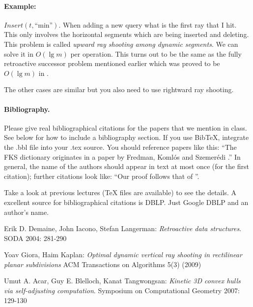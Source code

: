 \documentclass[11pt]{article}
\begin{document}
\paragraph{Example:} $Insert(t, \text{``min''})$.  When adding a new query what is the first ray that I hit.  This only involves the horizontal segments which are being inserted and deleting.  This problem is called \emph{upward ray shooting among dynamic segments}.  We can solve it in $O(\lg m)$ per operation.  This turns out to be the same as the fully retroactive successor problem mentioned earlier which was proved to be $O(\lg m)$ in \cite{gk}.

The other cases are similar but you also need to use rightward ray shooting.

\paragraph{Bibliography.}
Please give real bibliographical citations for the papers that we
mention in class. See below for how to include a bibliography section.
If you use BibTeX, integrate the .bbl file into your .tex
source. You should reference papers like this: ``The FKS
dictionary originates in a paper by Fredman, Koml\'{o}s and
Szemer\'{e}di \cite{fks}.'' In general, the name of the authors should
appear in text at most once (for the first citation); further
citations look like: ``Our proof follows that of \cite{fks}''.

Take a look at previous lectures (TeX files are available) to see the
details. A excellent source for bibliographical citations is
DBLP. Just Google DBLP and an author's name.

%


\begin{thebibliography}{77}

Erik D. Demaine, John Iacono, Stefan Langerman: \emph{Retroactive data structures}. SODA 2004: 281-290

Yoav Giora, Haim Kaplan: \emph{Optimal dynamic vertical ray shooting in rectilinear planar subdivisions} ACM Transactions on Algorithms 5(3) (2009)

 Umut A. Acar, Guy E. Blelloch, Kanat Tangwongsan: \emph{Kinetic 3D convex hulls via self-adjusting computation}. Symposium on Computational Geometry 2007: 129-130

\end{thebibliography}
\end{document}
